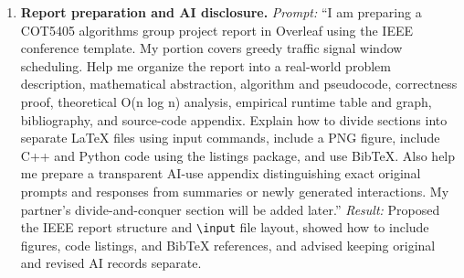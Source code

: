\begin{enumerate}
\item \textbf{Report preparation and AI disclosure.}
\emph{Prompt:} ``I am preparing a COT5405 algorithms
group project report in Overleaf using the IEEE
conference template. My portion covers greedy traffic
signal window scheduling. Help me organize the report
into a real-world problem description, mathematical
abstraction, algorithm and pseudocode, correctness
proof, theoretical O(n log n) analysis, empirical
runtime table and graph, bibliography, and source-code
appendix. Explain how to divide sections into separate
LaTeX files using input commands, include a PNG figure,
include C++ and Python code using the listings package,
and use BibTeX. Also help me prepare a transparent AI-use
appendix distinguishing exact original prompts and
responses from summaries or newly generated
interactions. My partner's divide-and-conquer section
will be added later.''
\emph{Result:} Proposed the IEEE report structure and
\texttt{\textbackslash input} file layout, showed how to
include figures, code listings, and BibTeX references,
and advised keeping original and revised AI records
separate.

\end{enumerate}
